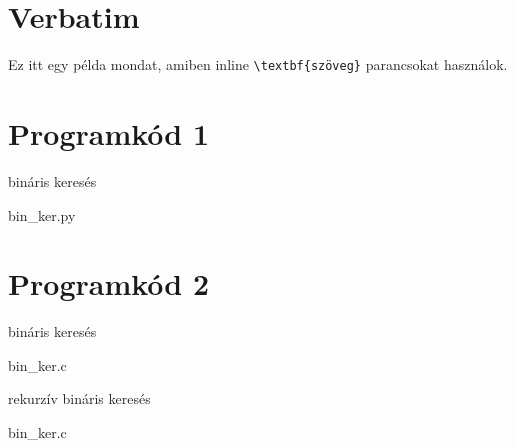 \documentclass{article}
\begin{document}
\clearpage
\section{Verbatim}
Ez itt egy példa mondat, amiben inline \verb|\textbf{szöveg}| parancsokat használok.

\section{Programkód 1}
\begin{python}
	\caption{bináris keresés}
	 {bin_ker.py}
\end{python}

\clearpage
\section{Programkód 2}
\begin{c}
	\caption{bináris keresés}
	 {bin_ker.c}
\end{c}

\begin{c}
	\caption{rekurzív bináris keresés}
	 {bin_ker.c}
\end{c}
\end{document}
